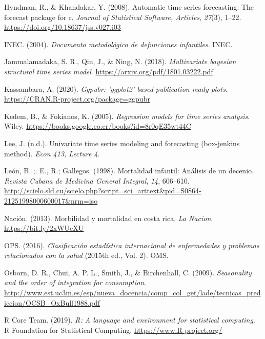 \documentclass[
]{article}
\newlength{\cslhangindent}
\newlength{\cslentryspacingunit} %
\newenvironment{CSLReferences}[2] %
 {%
  \setlength{\parindent}{0pt}
  \ifodd #1
  \let\oldpar\par
  \def\par{\hangindent=\cslhangindent\oldpar}
  \fi
  \setlength{\parskip}{#2\cslentryspacingunit}
 }%
 {}
\begin{document}
\begin{CSLReferences}{1}{0}
\leavevmode{}%
Hyndman, R., \& Khandakar, Y. (2008). Automatic time series forecasting:
The forecast package for r. \emph{Journal of Statistical Software,
Articles}, \emph{27}(3), 1--22.
\url{https://doi.org/10.18637/jss.v027.i03}

\leavevmode{}%
INEC. (2004). \emph{Documento metodológico de defunciones infantiles}.
INEC.

\leavevmode{}%
Jammalamadaka, S. R., Qiu, J., \& Ning, N. (2018). \emph{Multivariate
bayesian structural time series model}.
\url{https://arxiv.org/pdf/1801.03222.pdf}

\leavevmode{}%
Kassambara, A. (2020). \emph{Ggpubr: 'ggplot2' based publication ready
plots}. \url{https://CRAN.R-project.org/package=ggpubr}

\leavevmode{}%
Kedem, B., \& Fokianos, K. (2005). \emph{Regression models for time
series analysis}. Wiley.
\url{https://books.google.co.cr/books?id=8r0qE35wt44C}

\leavevmode{}%
Lee, J. (n.d.). Univariate time series modeling and forecasting
(box-jenkins method). \emph{Econ 413, Lecture 4}.

\leavevmode{}%
León, B. ;. E., R.; Gallegos. (1998). {Mortalidad infantil: Análisis de
un decenio}. \emph{{Revista Cubana de Medicina General Integral}},
\emph{14}, 606--610.
\url{http://scielo.sld.cu/scielo.php?script=sci_arttext\&pid=S0864-21251998000600017\&nrm=iso}

\leavevmode{}%
Nación. (2013). Morbilidad y mortalidad en costa rica. \emph{La Nacion}.
\url{https://bit.ly/2xWUeXU}

\leavevmode{}%
OPS. (2016). \emph{Clasificación estadística internacional de
enfermedades y problemas relacionados con la salud} (2015th ed., Vol.
2). OMS.

\leavevmode{}%
Osborn, D. R., Chui, A. P. L., Smith, J., \& Birchenhall, C. (2009).
\emph{Seasonality and the order of integration for consumption}.
\url{http://www.est.uc3m.es/esp/nueva_docencia/comp_col_get/lade/tecnicas_prediccion/OCSB_OxBull1988.pdf}

\leavevmode{}%
R Core Team. (2019). \emph{R: A language and environment for statistical
computing}. R Foundation for Statistical Computing.
\url{https://www.R-project.org/}


\end{CSLReferences}
\end{document}
